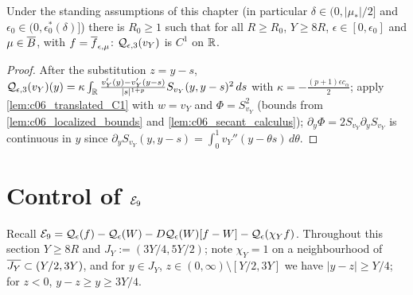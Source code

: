\begin{lemma}
  \label{lem:c06_cubic_vY_C1}
  Under the standing assumptions of this chapter (in particular $\delta\in(0,|\mu_*|/2]$ and
  $\epsilon_0\in(0,\epsilon_0^*(\delta)]$) there is $R_0\ge1$ such that for all $R\ge R_0$, $Y\ge8R$,
  $\epsilon\in[0,\epsilon_0]$ and $\mu\in\overline{B}$, with $f=\overline{f}_{\epsilon,\mu}$: $\mathcal{Q}_{\epsilon,3}(v_Y)$ is $C^1$ on $\mathbb{R}$.
\end{lemma}
\begin{proof}
  After the substitution $z=y-s$, $\mathcal{Q}_{\epsilon,3}(v_Y)(y)=\kappa\int_{\mathbb{R}}\frac{v_Y'(y)-v_Y'(y-s)}{|s|^{1+p}}S_{v_Y}(y,y-s)^2\,ds$
  with $\kappa=-\frac{(p+1)\epsilon c_\alpha}2$; apply \cref{lem:c06_translated_C1} with $w=v_Y$ and $\Phi=S_{v_Y}^2$
  (bounds from \cref{lem:c06_localized_bounds} and \cref{lem:c06_secant_calculus}); $\partial_y\Phi=2S_{v_Y}\partial_yS_{v_Y}$ is
  continuous in $y$ since $\partial_yS_{v_Y}(y,y-s)=\int_0^1v_Y''(y-\theta s)\,d\theta$.
\end{proof}

\section{Control of $\mathcal{E}_9$}

Recall $\mathcal{E}_9=\mathcal{Q}_\epsilon(f)-\mathcal{Q}_\epsilon(W)-D\mathcal{Q}_\epsilon(W)[f-W]-\mathcal{Q}_\epsilon(\chi_Yf)$.
Throughout this section $Y\ge8R$ and $J_Y:=(3Y/4,5Y/2)$; note $\chi_Y=1$ on a neighbourhood of $\overline{J_Y}\subset(Y/2,3Y)$, and
for $y\in J_Y$, $z\in(0,\infty)\setminus[Y/2,3Y]$ we have $|y-z|\ge Y/4$; for $z<0$, $y-z\ge y\ge 3Y/4$.

